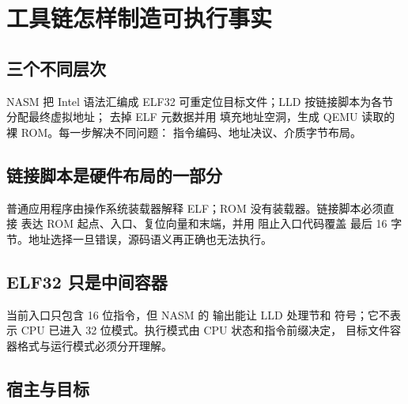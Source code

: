 \chapter{工具链怎样制造可执行事实}

\section{三个不同层次}

NASM 把 Intel 语法汇编成 ELF32 可重定位目标文件；LLD 按链接脚本为各节
分配最终虚拟地址； 去掉 ELF 元数据并用
 填充地址空洞，生成 QEMU 读取的裸 ROM。每一步解决不同问题：
指令编码、地址决议、介质字节布局。

\begin{center}
\end{center}

\section{链接脚本是硬件布局的一部分}

普通应用程序由操作系统装载器解释 ELF；ROM 没有装载器。链接脚本必须直接
表达 ROM 起点、入口、复位向量和末端，并用  阻止入口代码覆盖
最后 16 字节。地址选择一旦错误，源码语义再正确也无法执行。

\section{ELF32 只是中间容器}

当前入口只包含 16 位指令，但 NASM 的  输出能让 LLD 处理节和
符号；它不表示 CPU 已进入 32 位模式。执行模式由 CPU 状态和指令前缀决定，
目标文件容器格式与运行模式必须分开理解。

\section{宿主与目标}

